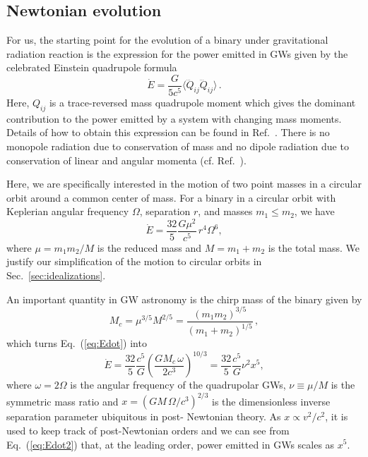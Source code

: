 \documentclass[prd,amsmath,amssymb,aps,floats,amsfonts,notitlepage,superscriptaddress,eqsecnum,nofootinbib,10pt]{revtex4-1}
\newcommand{\f}{\frac}
\newcommand{\be}{\begin{equation}}
\newcommand{\ee}{\end{equation}}
\begin{document}
\subsection{Newtonian evolution}
For us, the starting point for the evolution of a binary under gravitational radiation reaction
is the expression for the power emitted in GWs given by 
the celebrated Einstein quadrupole formula \cite{1918SPAW}
%
\be
\dot{E} = \f{G}{5c^5}\langle \dddot{Q}_{ij}\dddot{Q}_{ij} \rangle \label{eq:Edot_quadrupole}\, .
\ee
%
Here, $Q_{ij}$ is a trace-reversed mass quadrupole moment which
gives the dominant contribution to the power emitted %
by a system with changing mass moments. Details of how to obtain this expression can be found in Ref.~\cite{Maggiore}.
There is no monopole radiation due to conservation of mass and no dipole radiation due to conservation of linear and angular momenta
(cf. Ref.~\cite{Mono}).

Here, we are specifically interested in the motion of two point masses in a circular orbit around a common center of mass.
For a binary in a circular orbit with Keplerian angular frequency $\Omega$, separation $r$, and masses $m_1 \le m_2$, we have \cite{Maggiore}
%
\be
\dot{E} = \f{32}{5}\f{G\mu^2}{c^5}\, r^4 \Omega^6\label{eq:Edot},
\ee
%
where $\mu= m_1 m_2/M$ is the reduced mass and $M=m_1+m_2$ is the total mass. 
We justify our simplification of the motion to circular orbits in Sec.~\ref{sec:idealizations}.

An important quantity in GW astronomy is the chirp mass of the binary given by
%
\be
M_c = \mu^{3/5} M^{2/5} = \f{(m_1 m_2)^{3/5}}{(m_1+m_2)^{1/5}} \label{eq:chirp_mass}\, ,
\ee
%
which turns Eq.~(\ref{eq:Edot}) into
%
\be
\dot{E} = \f{32}{5}\f{c^5}{G} \left(\f{G M_c\, \omega}{2c^3}\right)^{10/3}= \f{32}{5}\f{c^5}{G} \nu^2 x^5, \label{eq:Edot2}
\ee
%
where $\omega=2\Omega$ is the angular frequency of the quadrupolar GWs, $\nu\equiv \mu/M$ is the symmetric mass ratio and $x = ({G M\, \Omega}/{c^3})^{2/3} $ is the dimensionless inverse separation parameter ubiquitous 
in post- Newtonian theory. 
As $x\propto v^2/c^2$, it is used to keep track of post-Newtonian orders and we can see from Eq.~(\ref{eq:Edot2})
that, at the leading order, power emitted in GWs scales as $x^5$.
\end{document}
